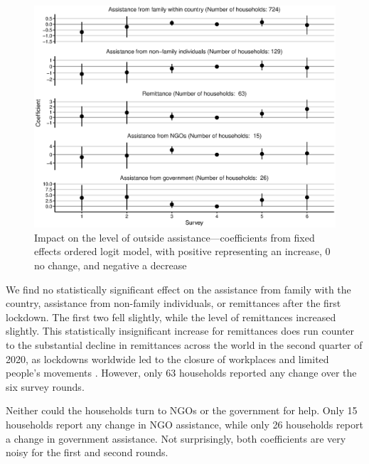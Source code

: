 \documentclass{wber}
\begin{document}
\begin{figure}
\caption{Impact on the level of outside assistance---coefficients from
fixed effects ordered logit model, with positive representing an
increase, 0 no change, and negative a
decrease}\label{fig:income_assistance}
\begin{center}
\includegraphics[width=\linewidth, keepaspectratio]{./eps/fig_10.eps}
\end{center}
\end{figure}

We find no statistically significant effect on the assistance from
family with the country, assistance from non-family individuals, or
remittances after the first lockdown. The first two fell slightly, while
the level of remittances increased slightly. This statistically
insignificant increase for remittances does run counter to the
substantial decline in remittances across the world in the second
quarter of 2020, as lockdowns worldwide led to the closure of workplaces
and limited people's movements
\citep{Cardozo-Silva2022, Guha2021, Kpodar2023, Shimizutani2021, Zhang2021}.
However, only 63 households reported any change over the six survey
rounds.

Neither could the households turn to NGOs or the government for help.
Only 15 households report any change in NGO assistance, while only 26
households report a change in government assistance. Not surprisingly,
both coefficients are very noisy for the first and second rounds.
\end{document}
